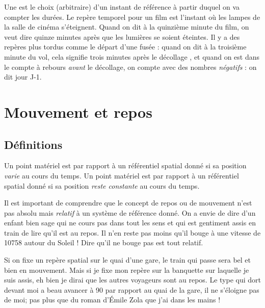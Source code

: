 Une  est le choix (arbitraire) d'un instant de référence à partir duquel on va compter les durées. Le repère temporel pour un film est l'instant où les lampes de la salle de cinéma s'éteignent. Quand on dit \og à la quinzième minute du film\fg, on veut dire \og quinze minutes après que les lumières se soient éteintes\fg. Il y a des repères plus tordus comme le départ d'une fusée : quand on dit \og à la troisième minute du vol\fg, cela signifie \og trois minutes après le décollage \fg, et quand on est dans le compte à rebours \emph{avant} le décollage, on compte avec des nombres \emph{négatifs} : on dit \og jour J-1\fg.


\section{Mouvement et repos}

\subsection{Définitions}

Un point matériel est  par rapport à un référentiel spatial donné si sa position \emph{varie} au cours du temps. Un point matériel est  par rapport à un référentiel spatial donné si sa position \emph{reste constante} au cours du temps.

Il est important de comprendre que le concept de repos ou de mouvement n'est pas \og absolu\fg{} mais \emph{relatif} à un système de référence donné. On a envie de dire d'un enfant bien sage qui ne cours pas dans tout les sens et qui est gentiment assis en train de lire qu'il est au repos. Il n'en reste pas moins qu'il bouge à une vitesse de \unit{10758}{\kilo\meter\per\hour} autour du Soleil ! Dire qu'il ne bouge pas est tout relatif.

\begin{exemple}
Si on fixe un repère spatial sur le quai d'une gare, le train qui passe sera bel et bien en mouvement. Mais si je fixe mon repère sur la banquette sur laquelle je suis assis, eh bien je dirai que les autres voyageurs sont au repos. Le type qui dort devant moi a beau avancer à \unit{90}{\kilo\meter\per\hour}   par rapport au quai de la gare, il ne s'éloigne pas de moi; pas plus que du roman d'Émile Zola que j'ai dans les mains !
\end{exemple}


